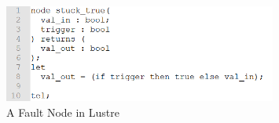 \begin{figure}[h]
	\begin{center}
		\includegraphics[width=0.8\textwidth]{images/lustreFaultNode.png}
	\end{center}
	\caption{A Fault Node in Lustre}
	\label{fig:lustreFaultNode}
\end{figure}

